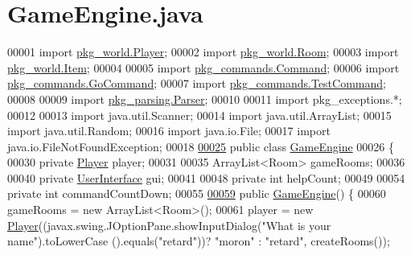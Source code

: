 \hypertarget{GameEngine_8java_source}{\section{Game\-Engine.\-java}
}

\begin{DoxyCode}
00001 \textcolor{keyword}{import} \hyperlink{classpkg__world_1_1Player}{pkg\_world.Player};
00002 \textcolor{keyword}{import} \hyperlink{classpkg__world_1_1Room}{pkg\_world.Room};
00003 \textcolor{keyword}{import} \hyperlink{classpkg__world_1_1Item}{pkg\_world.Item};
00004 
00005 \textcolor{keyword}{import} \hyperlink{classpkg__commands_1_1Command}{pkg\_commands.Command};
00006 \textcolor{keyword}{import} \hyperlink{classpkg__commands_1_1GoCommand}{pkg\_commands.GoCommand};
00007 \textcolor{keyword}{import} \hyperlink{classpkg__commands_1_1TestCommand}{pkg\_commands.TestCommand};
00008 
00009 \textcolor{keyword}{import} \hyperlink{classpkg__parsing_1_1Parser}{pkg\_parsing.Parser};
00010 
00011 \textcolor{keyword}{import} pkg\_exceptions.*;
00012 
00013 \textcolor{keyword}{import} java.util.Scanner;
00014 \textcolor{keyword}{import} java.util.ArrayList;
00015 \textcolor{keyword}{import} java.util.Random;
00016 \textcolor{keyword}{import} java.io.File;
00017 \textcolor{keyword}{import} java.io.FileNotFoundException;
00018 
\hypertarget{GameEngine_8java_source_l00025}{}\hyperlink{classGameEngine}{00025} \textcolor{keyword}{public} \textcolor{keyword}{class }\hyperlink{classGameEngine}{GameEngine}
00026 \{
00030     \textcolor{keyword}{private} \hyperlink{classpkg__world_1_1Player}{Player} player;
00031 
00035     ArrayList<Room> gameRooms;
00036 
00040     \textcolor{keyword}{private} \hyperlink{classUserInterface}{UserInterface} gui;
00041 
00048     \textcolor{keyword}{private} \textcolor{keywordtype}{int} helpCount;
00049 
00054     \textcolor{keyword}{private} \textcolor{keywordtype}{int} commandCountDown;
00055 
\hypertarget{GameEngine_8java_source_l00059}{}\hyperlink{classGameEngine_a9e8a92f5021a34293060f9aaff4005de}{00059}     \textcolor{keyword}{public} \hyperlink{classGameEngine_a9e8a92f5021a34293060f9aaff4005de}{GameEngine}() \{
00060         gameRooms = \textcolor{keyword}{new} ArrayList<Room>();
00061         player = \textcolor{keyword}{new} \hyperlink{classpkg__world_1_1Player}{Player}((javax.swing.JOptionPane.showInputDialog(\textcolor{stringliteral}{"What is your name"}).toLowerCase
      ().equals(\textcolor{stringliteral}{"retard"}))? \textcolor{stringliteral}{"moron"} : \textcolor{stringliteral}{"retard"}, createRooms());

\end{DoxyCode}
